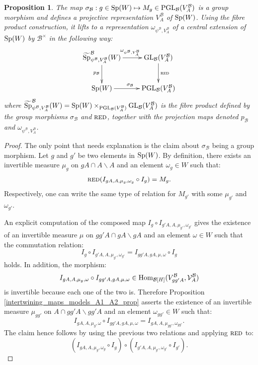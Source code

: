 \documentclass[11pt]{article}
\theoremstyle{plain}
\newtheorem{prop}[theo]{Proposition}
\theoremstyle{definition}
\theoremstyle{plain}
\theoremstyle{definition}
\theoremstyle{plain}
\begin{document}
\begin{prop} \label{weil_rep_def_prop} The map $\sigma_\mathcal{B} : g \in \textup{Sp}(W) \mapsto M_g \in \textup{PGL}_\mathcal{B}(V_A^\mathcal{B})$ is a group morphism and defines a projective representation $V_A^\mathcal{B}$ of $\textup{Sp}(W)$. Using the fibre product construction, it lifts to a representation $\omega_{\psi^\mathcal{B},V_A^\mathcal{B}}$ of a central extension of $\textup{Sp}(W)$ by $\mathcal{B}^\times$ in the following way:
$$\xymatrix{
		\widetilde{\textup{Sp}}_{\psi^\mathcal{B},V_A^\mathcal{B}}^\mathcal{B}(W) \ar[r]^{\omega_{\psi^\mathcal{B},V_A^\mathcal{B}}} \ar[d]_{p_\mathcal{B}} & \textup{GL}_\mathcal{B}(V_A^\mathcal{B})  \ar[d]^{\textup{\textsc{red}}} \\
		\textup{Sp}(W) \ar[r]^{\sigma_\mathcal{B}} & \textup{PGL}_\mathcal{B}(V_A^\mathcal{B})}$$
where $\widetilde{\textup{Sp}}_{\psi^\mathcal{B},V_A^\mathcal{B}}^\mathcal{B}(W)=\textup{Sp}(W) \times_{\textup{PGL}_\mathcal{B}(V_A^\mathcal{B})} \textup{GL}_\mathcal{B}(V_A^\mathcal{B})$ is the fibre product defined by the group morphisms $\sigma_\mathcal{B}$ and $\textup{\textsc{red}}$, together with the projection maps denoted $p_\mathcal{B}$ and $ \omega_{\psi^\mathcal{B},V_A^\mathcal{B}}$. \end{prop}

\begin{proof} The only point that needs explanation is the claim about $\sigma_\mathcal{B}$ being a group morphism. Let $g$ and $g'$ be two elements in $\textup{Sp}(W)$. By definition, there exists an invertible measure $\mu_g$ on $gA \cap A \backslash A$ and an element $\omega_g \in W$ such that:
$$\textup{\textsc{red}}(I_{gA,A,\mu_{g},\omega_g} \circ I_g) = M_g.$$
Respectively, one can write the same type of relation for $M_{g'}$ with some $\mu_{g'}$ and $\omega_{g'}$.

An explicit computation of the composed map $I_g \circ I_{g'A,A,\mu_{g'},\omega_{g'}}$ gives the existence of an invertible measure $\mu$ on $g g' A \cap gA \backslash gA$ and an element $\omega \in W$ such that the commutation relation:
$$I_g \circ I_{g'A,A,\mu_{g'},\omega_{g'}} = I_{gg'A,gA,\mu,\omega} \circ I_g$$
holds. In addition, the morphism:
$$I_{gA,A,\mu_g,\omega} \circ I_{gg'A,gA,\mu,\omega} \in \textup{Hom}_{\mathcal{B}[H]}(V_{g g'A}^\mathcal{B}, \mathcal{V}_A^\mathcal{B})$$
is invertible because each one of the two is. Therefore Proposition \ref{intertwining_maps_models_A1_A2_prop} asserts the existence of an invertible measure $\mu_{g g'}$ on $A \cap g g' A \backslash g g' A$ and an element $\omega_{g g'} \in W$ such that:
$$ I_{gA,A,\mu_g,\omega} \circ I_{gg'A,gA,\mu,\omega} = I_{gA,A,\mu_{g g'},\omega_{g g'}}.$$
The claim hence follows by using the previous two relations and applying $\textup{\textsc{red}}$ to:
$$(I_{gA,A,\mu_{g},\omega_g} \circ I_g) \circ (I_{g'A,A,\mu_{g'},\omega_{g'}} \circ I_{g'}).$$ \end{proof}
\end{document}
